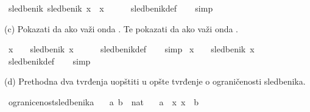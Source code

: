 \begin{isabellebody}
\begin{exercise}[subtitle=Primer jednostavne teorije]
\isanewline
{}\isamarkupfalse%
\ {\isachardoublequoteopen}sledbenik\ {\isacharparenleft}{\kern0pt}sledbenik\ x{\isacharparenright}{\kern0pt}\ {\isacharequal}{\kern0pt}\ x\ {\isacharplus}{\kern0pt}\ {}{\isachardoublequoteclose}\isanewline
%
\isadelimproof
\ \ %
\endisadelimproof
%
\isatagproof
{}\isamarkupfalse%
\ sledbenik{\isacharunderscore}{\kern0pt}def\isanewline
\ \ \isamarkupfalse%
\ simp%
\endisatagproof
{\isafoldproof}%
%
\isadelimproof
%
\endisadelimproof
%
\begin{isamarkuptext}%
(c) Pokazati da ako važi  onda .
          Te pokazati da ako važi  onda .%
\end{isamarkuptext}\isamarkuptrue%
\isamarkupfalse%
\ {\isachardoublequoteopen}x\ {\isachargreater}{\kern0pt}\ {}\ {\isasymlongrightarrow}\ sledbenik\ x\ {\isachargreater}{\kern0pt}\ {}{\isachardoublequoteclose}\isanewline
%
\isadelimproof
\ \ %
\endisadelimproof
%
\isatagproof
{}\isamarkupfalse%
\ sledbenik{\isacharunderscore}{\kern0pt}def\isanewline
\ \ \isamarkupfalse%
\ simp%
\endisatagproof
{\isafoldproof}%
%
\isadelimproof
\isanewline
%
\endisadelimproof
\isanewline
{}\isamarkupfalse%
\ {\isachardoublequoteopen}x\ {\isacharless}{\kern0pt}\ {}\ {\isasymlongrightarrow}\ sledbenik\ x\ {\isacharless}{\kern0pt}\ {}{\isachardoublequoteclose}\isanewline
%
\isadelimproof
\ \ %
\endisadelimproof
%
\isatagproof
{}\isamarkupfalse%
\ sledbenik{\isacharunderscore}{\kern0pt}def\isanewline
\ \ \isamarkupfalse%
\ simp%
\endisatagproof
{\isafoldproof}%
%
\isadelimproof
%
\endisadelimproof
%
\begin{isamarkuptext}%
(d) Prethodna dva tvrđenja uopštiti u opšte tvrđenje o ograničenosti sledbenika.%
\end{isamarkuptext}\isamarkuptrue%
\isamarkupfalse%
\ ogranicenost{\isacharunderscore}{\kern0pt}sledbenika{\isacharcolon}{\kern0pt}\isanewline
\ \ \ a\ b\ {\isacharcolon}{\kern0pt}{\isacharcolon}{\kern0pt}\ nat\isanewline
\ \ \ {\isachardoublequoteopen}a\ {\isacharless}{\kern0pt}\ x{\isachardoublequoteclose}\ {\isachardoublequoteopen}x\ {\isacharless}{\kern0pt}\ b{\isachardoublequoteclose}\isanewline

\end{exercise}
\end{isabellebody}
